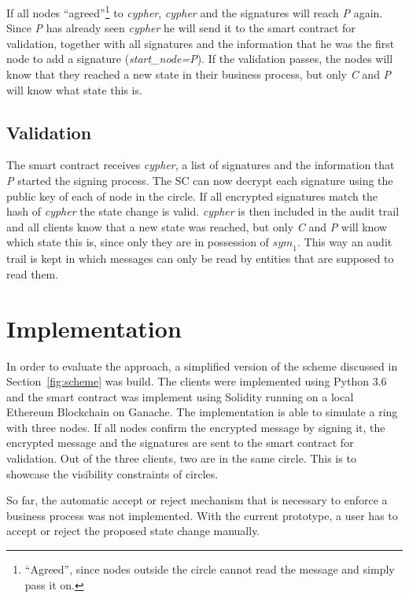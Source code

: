 \documentclass[runningheads]{llncs}
\newcommand{\ber}[1]{\textit{#1}}
\newcommand{\refsec}[1]{Section~\ref{#1}}
\newcommand{\quotel}{``}
\newcommand{\quoter}{''}
\begin{document}
If all nodes \quotel agreed\quoter \footnote{\quotel Agreed\quoter, since nodes outside the circle cannot read the message and simply pass it on.} to \ber{cypher}, \ber{cypher} and the signatures will reach \ber{P} again. Since \ber{P} has already seen \ber{cypher} he will send it to the smart contract for validation, together with all signatures and the information that he was the first node to add a signature (\ber{start\_node=P}). If the validation passes, the nodes will know that they reached a new state in their business process, but only \ber{C} and \ber{P} will know what state this is.



\subsection{Validation} \label{subsec:furtherinfo}

The smart contract receives \ber{cypher}, a list of signatures and the information that \ber{P} started the signing process. The SC can now decrypt each signature using the public key of each of node in the circle. If all encrypted signatures match the hash of \ber{cypher} the state change is valid. \ber{cypher} is then included in the audit trail and all clients know that a new state was reached, but only \ber{C} and \ber{P} will know which state this is, since only they are in possession of ${sym}_1$. This way an audit trail is kept in which messages can only be read by entities that are supposed to read them.


\section{Implementation} \label{sec:eval}


In order to evaluate the approach, a simplified version of the scheme discussed in \refsec{fig:scheme} was build. The clients were implemented using Python 3.6 and the smart contract was implement using Solidity running on a local Ethereum Blockchain on Ganache. The implementation is able to simulate a ring with three nodes. If all nodes confirm the encrypted message by signing it, the encrypted message and the signatures are sent to the smart contract for validation. Out of the three clients, two are in the same circle. This is to showcase the visibility constraints of circles. 

So far, the automatic accept or reject mechanism that is necessary to enforce a business process was not implemented. With the current prototype, a user has to accept or reject the proposed state change manually. 
\end{document}
